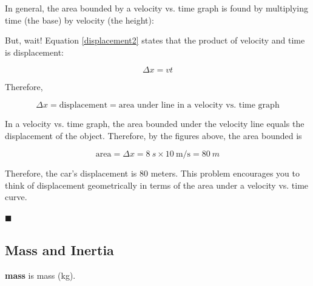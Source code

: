 \documentclass[dvipsnames]{article}
\begin{document}
In general, the area bounded by a velocity vs. time graph is found by multiplying time (the base) by velocity (the height):

\begin{center}
\end{center}

But, wait! Equation \eqref{displacement2} states that the product of velocity and time is displacement: 

\begin{equation*}
    \Delta x = v t
\end{equation*}

Therefore,

\begin{equation*}
    \Delta x = \text{displacement} = \text{area under line in a velocity vs. time graph}
\end{equation*}

In a velocity vs. time graph, the area bounded under the velocity line equals the displacement of the object. Therefore, by the figures above, the area bounded is

\begin{equation*}
    \text{area} = \Delta x = \SI{8}{s} \times \SI[per-mode=fraction]{10}{\meter\per\second} = \boxed{\SI{80}{m}}
\end{equation*}

Therefore, the car's displacement is 80 meters. This problem encourages you to think of displacement geometrically in terms of the area under a velocity vs. time curve.

\hfill $\blacksquare$


\subsection{Mass and Inertia}

\textbf{\Gls{mass}} is \glsdesc{mass} (kg). 
\end{document}
